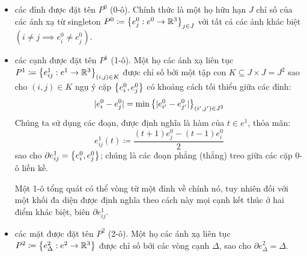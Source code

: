 \documentclass{article}
\theoremstyle{plain}
\theoremstyle{definition}
\begin{document}
\begin{itemize}
    \item các đỉnh được đặt tên $P^0$ (0-ô). Chính thức là một họ hữu hạn $J$ chỉ số của các ánh xạ từ singleton $P^0\coloneqq\left\{e^0_j: e^0\to \mathbb{R}^3\right\}_{j\in J}$ với tất cả các ảnh khác biệt $(i\neq j\implies e^0_i\neq e^0_j)$.
    \item các cạnh được đặt tên $P^1$ (1-ô). Một họ các ánh xạ liên tục $P^1\coloneqq\left\{e^1_{ij}:  e^1\to \mathbb{R}^3\right\}_{(i,j)\in K}$ được chỉ số bởi một tập con $K\subseteq J\times J=J^2$ sao cho $(i,j)\in K$ ngụ ý cặp $\left\{e^0_i, e^0_j\right\}$ có khoảng cách tối thiểu giữa các đỉnh: 
    \begin{equation}
        |e^0_i-e^0_j|=\min \left\{|e^0_{i'}-e^0_{j'}|\right\}_{(i',j')\in J^2}
    \end{equation}
    Chúng ta sử dụng các đoạn, được định nghĩa là hàm của $t\in e^1$, thỏa mãn: 
    \begin{equation}
        e^1_{ij}(t)\coloneqq\frac{(t+1)e^0_j-(t-1)e^0_i}{2}
    \end{equation}
    sao cho $\partial e^1_{ij}=\left\{e^0_i, e^0_j\right\}$; chúng là các đoạn phẳng (thẳng) treo giữa các cặp 0-ô liền kề.
     
    Một 1-ô tổng quát có thể vòng từ một đỉnh về chính nó, tuy nhiên đối với một khối đa diện được định nghĩa theo cách này mọi cạnh kết thúc ở hai điểm khác biệt, biên $\partial e^1_{ij}$. 
    \item  các mặt được đặt tên $P^2$ (2-ô). Một họ các ánh xạ liên tục $P^2\coloneqq\left\{e^2_{\Delta}:  e^2\to \mathbb{R}^3\right\}$ được chỉ số bởi các vòng cạnh $\Delta$, sao cho $\partial e^2_{\Delta}=\Delta$.  
\end{itemize}
\end{document}
